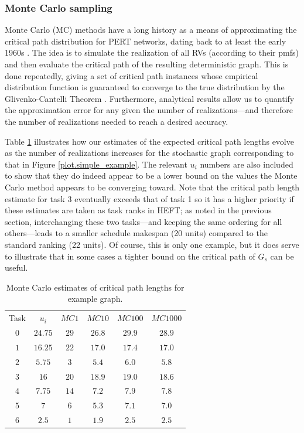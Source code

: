 \documentclass[12pt]{article}
\begin{document}
\subsubsection{Monte Carlo sampling}
\label{subsubsect.monte_carlo}

Monte Carlo (MC) methods have a long history as a means of approximating the critical path distribution for PERT networks, dating back to at least the early 1960s \cite{van1963letter}. The idea is to simulate the realization of all RVs (according to their pmfs) and then evaluate the critical path of the resulting deterministic graph. This is done repeatedly, giving a set of critical path instances whose empirical distribution function is guaranteed to converge to the true distribution by the Glivenko-Cantelli Theorem \cite{canon2016correlation}. Furthermore, analytical results allow us to quantify the approximation error for any given the number of realizations---and therefore the number of realizations needed to reach a desired accuracy.  

Table \ref{tb.mc_example} illustrates how our estimates of the expected critical path lengths evolve as the number of realizations increases for the stochastic graph corresponding to that in Figure \ref{plot.simple_example}. The relevant $u_i$ numbers are also included to show that they do indeed appear to be a lower bound on the values the Monte Carlo method appears to be converging toward. Note that the critical path length estimate for task 3 eventually exceeds that of task 1 so it has a higher priority if these estimates are taken as task ranks in HEFT; as noted in the previous section, interchanging these two tasks---and keeping the same ordering for all others---leads to a smaller schedule makespan (20 units) compared to the standard ranking (22 units). Of course, this is only one example, but it does serve to illustrate that in some cases a tighter bound on the critical path of $G_s$ can be useful.  

\begin{table} %
	\caption{Monte Carlo estimates of critical path lengths for example graph.} 
	\begin{center}	
		\begin{tabular}{c c c c c c}
			\cmidrule{1-6}
			Task & $u_i$ & $MC1$ & $MC10$ & $MC100$ & $MC1000$\\
			\cmidrule{1-6}
			$0$ & $24.75$ & $29$ & $26.8$ & $29.9$ & $28.9$\\
			$1$ & $16.25$ & $22$ & $17.0$ & $17.4$ & $17.0$\\
			$2$ & $5.75$ & $3$ & $5.4$ & $6.0$ & $5.8$\\
			$3$ & $16$ & $20$ & $18.9$ & $19.0$ & $18.6$\\
			$4$ & $7.75$ & $14$ & $7.2$ & $7.9$ & $7.8$\\
			$5$ & $7$ & $6$ & $5.3$ & $7.1$ & $7.0$\\
			$6$ & $2.5$ & $1$ & $1.9$ & $2.5$ & $2.5$\\
			\bottomrule
		\end{tabular}
		\label{tb.mc_example}
	\end{center}	
\end{table} 
\end{document}
